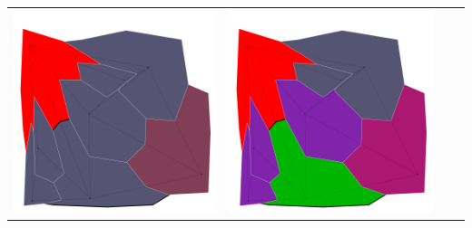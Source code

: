 \documentclass[10pt,a4paper]{article}
\begin{document}
\begin{tabular}{c c c c }
	\includegraphics[scale=.10]{../results/backtracking_mac/map_build/bt_mac_I00003.pdf}&
	\includegraphics[scale=.10]{../results/backtracking_mac/map_build/bt_mac_I00004.pdf}\\
	

\end{tabular}
\end{document}

